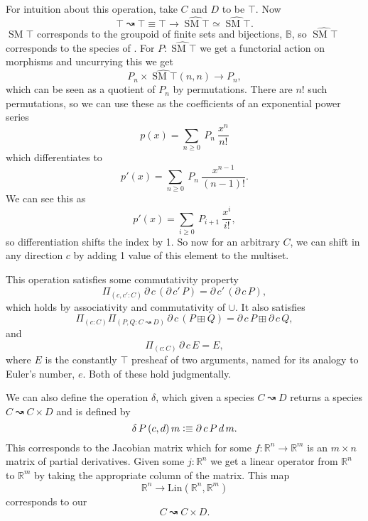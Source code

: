 \documentclass[12pt, parskip, DIV=14]{scrbook}
\newcommand{\defeq}{\vcentcolon\equiv}
\newcommand{\SM}{\operatorname{SM}}
\newcommand{\spec}[2]{#1 \rightwavearrow #2}
\begin{document}
For intuition about this operation, take $C$ and $D$ to be $\top$. Now $$\spec{\top}{\top} \equiv \top \to \widehat{\SM \top} \simeq \widehat{\SM \top}.$$ $\SM \top$ corresponds to the groupoid of finite sets and bijections, $\mathbb{B}$, so $\widehat{\SM \top}$ corresponds to the species of \citet{joyal1981une}. For $P : \widehat{\SM \top}$ we get a functorial action on morphisms and uncurrying this we get
$$P_n \times \widehat{\SM \top}(n,n) \to P_n,$$
which can be seen as a quotient of $P_n$ by permutations. There are $n!$ such permutations, so we can use these as the coefficients of an exponential power series
$$p(x) = \sum_{n \geq 0}~P_n~\frac{x^n}{n!}$$
which differentiates to
$$p'(x) = \sum_{n \geq 0}~P_n~\frac{x^{n-1}}{(n-1)!}.$$ We can see this as
$$p'(x) = \sum_{i \geq 0}~P_{i+1}~\frac{x^i}{i!},$$ so differentiation shifts the index by 1. So now for an arbitrary $C$, we can shift in any direction $c$ by adding 1 value of this element to the multiset.

This operation satisfies some commutativity property
$$\Pi_{(c , c' : C)}\,\partial\,c\,(\partial\,c'\,P) = \partial\,c'\,(\partial\,c\,P),$$ which holds by associativity and commutativity of $\cup$. It also satisfies
$$\Pi_{(c : C)}\Pi_{(P , Q : \spec{C}{D})}\,\partial\,c\,(P \boxplus Q) = \partial\,c\,P \boxplus \partial\,c\,Q,$$
and
$$\Pi_{(c : C)}\,\partial\,c\,E = E,$$ where $E$ is the constantly $\top$ presheaf of two arguments, named for its analogy to Euler's number, $e$. Both of these hold judgmentally.

We can also define the operation $\delta$, which given a species $\spec{C}{D}$ returns a species $\spec{C}{C \times D}$ and is defined by
$$\delta\,P\,(c , d)\,m \defeq \partial\,c\,P\,d\,m.$$
This corresponds to the Jacobian matrix which for some $f : \mathbb{R}^n \to \mathbb{R}^m$ is an $m \times n$ matrix of partial derivatives. Given some $j : \mathbb{R}^n$ we get a linear operator from $\mathbb{R}^n$ to $\mathbb{R}^m$ by taking the appropriate column of the matrix. This map
$$\mathbb{R}^n \to \mathrm{Lin}(\mathbb{R}^n,\mathbb{R}^m)$$
corresponds to our
$$\spec{C}{C \times D}.$$
\end{document}
